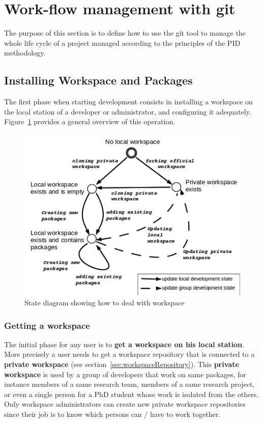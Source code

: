 \documentclass[12pt,a4paper]{article}
\begin{document}
\section{Work-flow management with git}

The purpose of this section is to define how to use the git tool to manage the whole life cycle of a project managed according to the principles of the PID methodology.

\subsection{Installing Workspace and Packages}

The first phase when starting development consists in installing a workspace on the local  station of a developer or administrator, and configuring it adequately. Figure~\ref{fig:install_workspace} provides a general overview of this operation.

\begin{figure}
\center
\includegraphics[scale=1]{images/installWorkspace.png}
\caption{State diagram showing how to deal with workspace}
\label{fig:install_workspace}
\end{figure}


\subsubsection{Getting a workspace}

The initial phase for any user is to \textbf{get a workspace on his local station}. More precisely a user needs to get a workspace repository that is connected to a \textbf{private workspace} (see section~\ref{sec:workspaceRepository}). This \textbf{private workspace} is used by a group of developers that work on same packages, for instance members of a same research team, members of a same research project, or even a single person for a PhD student whose work is isolated from the others. Only workspace administrators can create new private workspace repositories since their job is to know which persons can / have to work together.
\end{document}
